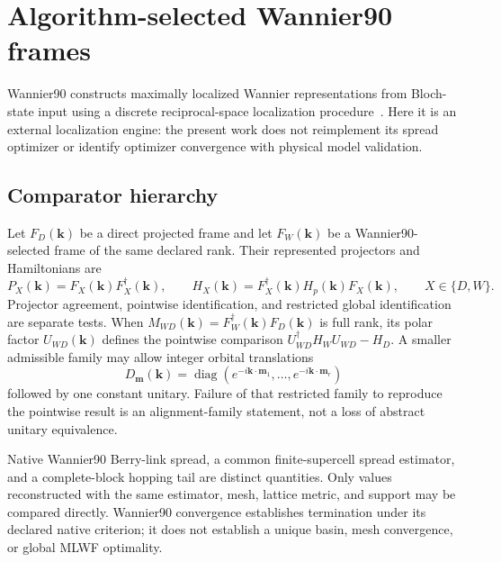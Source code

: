 \documentclass[11pt]{article}
\begin{document}
\section{Algorithm-selected Wannier90 frames}\label{sec:wannier-bridge}
Wannier90 constructs maximally localized Wannier representations from Bloch-state input
using a discrete reciprocal-space localization procedure~\cite{Mostofi2008,Pizzi2020}.
Here it is an external localization engine: the present work does not reimplement its
spread optimizer or identify optimizer convergence with physical model validation.

\subsection{Comparator hierarchy}
Let $F_D(\mathbf k)$ be a direct projected frame and let $F_W(\mathbf k)$ be a
Wannier90-selected frame of the same declared rank. Their represented projectors and
Hamiltonians are
\begin{equation}
 P_X(\mathbf k)=F_X(\mathbf k)F_X^\dagger(\mathbf k),
 \qquad
 H_X(\mathbf k)=F_X^\dagger(\mathbf k)H_p(\mathbf k)F_X(\mathbf k),
 \qquad X\in\{D,W\}.
\end{equation}
Projector agreement, pointwise identification, and restricted global identification are
separate tests. When
$M_{WD}(\mathbf k)=F_W^\dagger(\mathbf k)F_D(\mathbf k)$ is full rank, its polar factor
$U_{WD}(\mathbf k)$ defines the pointwise comparison
$U_{WD}^\dagger H_WU_{WD}-H_D$. A smaller admissible family may allow integer orbital
translations
\begin{equation}
 D_{\mathbf m}(\mathbf k)=\operatorname{diag}
 \left(e^{-i\mathbf k\cdot\mathbf m_1},\ldots,
       e^{-i\mathbf k\cdot\mathbf m_r}\right)
\end{equation}
followed by one constant unitary. Failure of that restricted family to reproduce the
pointwise result is an alignment-family statement, not a loss of abstract unitary
equivalence.

Native Wannier90 Berry-link spread, a common finite-supercell spread estimator, and a
complete-block hopping tail are distinct quantities. Only values reconstructed with the
same estimator, mesh, lattice metric, and support may be compared directly. Wannier90
convergence establishes termination under its declared native criterion; it does not
establish a unique basin, mesh convergence, or global MLWF optimality.
\end{document}
